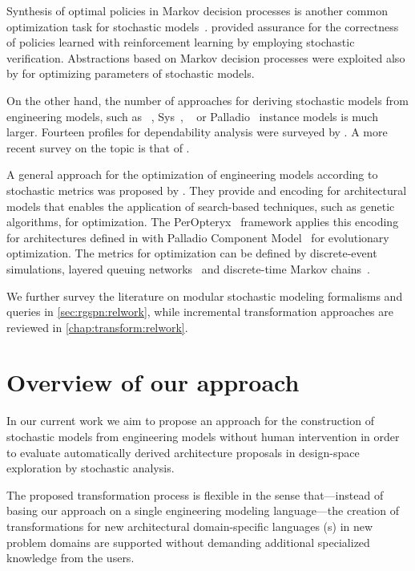Synthesis of optimal policies in Markov decision processes is another common optimization task for stochastic models~\citep{Baier17maximizing}. \citet{Mason17assurance} provided assurance for the correctness of policies learned with reinforcement learning by employing stochastic verification. Abstractions based on Markov decision processes were exploited also by \citet{Quatmann16mdp} for optimizing parameters of stochastic models. 

On the other hand, the number of approaches for deriving stochastic models from engineering models, such as ~\citep{Rumbaugh04uml}, Sys~\citep{Friedenthal16sysml}, ~\citep{Feiler12aadl} or Palladio~\citep{Becker08palladio} instance models is much larger. Fourteen  profiles for dependability analysis were surveyed by \citet{Bernardi08umlprofile}. A more recent survey on the topic is that of \citet{Koziolek10review}.

A general approach for the optimization of engineering models according to stochastic metrics was proposed by \citet{Koziolek11generic}. They provide and encoding for architectural models that enables the application of search-based techniques, such as genetic algorithms, for optimization. The PerOpteryx~\citep{Martens10evolutionary} framework applies this encoding for architectures defined in with Palladio Component Model~\citep{Becker08palladio} for evolutionary optimization. The metrics for optimization can be defined by discrete-event simulations, layered queuing networks~\citep{Franks09lqn} and discrete-time Markov chains~\citep{Koziolek09dependencies}.

We further survey the literature on modular stochastic modeling formalisms and queries in \vref{sec:rgspn:relwork}, while incremental transformation approaches are reviewed in \vref{chap:transform:relwork}.

\section{Overview of our approach}
\label{sec:intro:approach}

In our current work we aim to propose an approach for the construction of stochastic models from engineering models without human intervention in order to evaluate automatically derived architecture proposals in design-space exploration by stochastic analysis.

The proposed transformation process is flexible in the sense that---instead of basing our approach on a single engineering modeling language---the creation of transformations for new architectural domain-specific languages (s) in new problem domains are supported without demanding additional specialized knowledge from the users.

